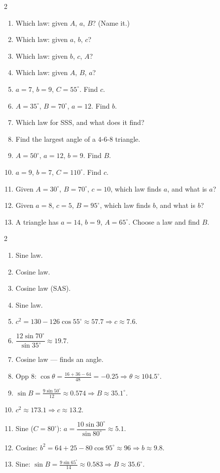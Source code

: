 \documentclass[11pt]{article}
\begin{document}
\begin{recapbox}
\begin{multicols}{2}
\small
\begin{enumerate}[leftmargin=*,itemsep=3pt]
  \item Which law: given $A$, $a$, $B$? (Name it.)
  \item Which law: given $a$, $b$, $c$?
  \item Which law: given $b$, $c$, $A$?
  \item Which law: given $A$, $B$, $a$?
  \item $a=7$, $b=9$, $C=55^\circ$. Find $c$.
  \item $A=35^\circ$, $B=70^\circ$, $a=12$. Find $b$.
  \item Which law for SSS, and what does it find?
  \item Find the largest angle of a $4$-$6$-$8$ triangle.
  \item $A=50^\circ$, $a=12$, $b=9$. Find $B$.
  \item $a=9$, $b=7$, $C=110^\circ$. Find $c$.
  \item Given $A=30^\circ$, $B=70^\circ$, $c=10$, which law finds $a$, and what is $a$?
  \item Given $a=8$, $c=5$, $B=95^\circ$, which law finds $b$, and what is $b$?
  \item A triangle has $a=14$, $b=9$, $A=65^\circ$. Choose a law and find $B$.
\end{enumerate}
\end{multicols}
\end{recapbox}

\begin{keybox}
\begin{multicols}{2}
\small
\begin{enumerate}[leftmargin=*,itemsep=3pt]
  \item Sine law.
  \item Cosine law.
  \item Cosine law (SAS).
  \item Sine law.
  \item $c^2=130-126\cos55^\circ\approx57.7\Rightarrow c\approx7.6$.
  \item $\dfrac{12\sin70^\circ}{\sin35^\circ}\approx19.7$.
  \item Cosine law --- finds an angle.
  \item Opp $8$: $\cos\theta=\tfrac{16+36-64}{48}=-0.25\Rightarrow\theta\approx104.5^\circ$.
  \item $\sin B=\tfrac{9\sin50^\circ}{12}\approx0.574\Rightarrow B\approx35.1^\circ$.
  \item $c^2\approx173.1\Rightarrow c\approx13.2$.
  \item Sine ($C=80^\circ$): $a=\dfrac{10\sin30^\circ}{\sin80^\circ}\approx5.1$.
  \item Cosine: $b^2=64+25-80\cos95^\circ\approx96\Rightarrow b\approx9.8$.
  \item Sine: $\sin B=\tfrac{9\sin65^\circ}{14}\approx0.583\Rightarrow B\approx35.6^\circ$.
\end{enumerate}
\end{multicols}
\end{keybox}
\end{document}
